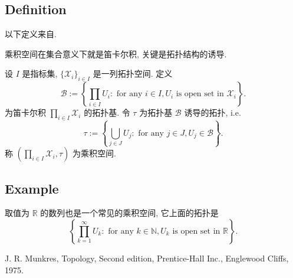 \documentclass[a4paper,11pt]{article}
\theoremstyle{definition}
\begin{document}
\subsection{Definition}

以下定义来自\cite[p.114]{m75}.

乘积空间在集合意义下就是笛卡尔积, 关键是拓扑结构的诱导.

设 $ I $ 是指标集, $ \{\mathcal{X}_i\}_{i \in I} $ 是一列拓扑空间.
定义
$$
    \mathcal{B}
        := \left\{ \prod_{i \in I} U_i
            : \text{ for any } i \in I, U_i \text{ is open set in } \mathcal{X}_i \right\}.
$$
为笛卡尔积 $ \prod_{i \in I} \mathcal{X}_i $ 的拓扑基. 令 $ \tau $ 为拓扑基 $ \mathcal{B} $ 诱导的拓扑, i.e.
$$
    \tau := \left\{ \bigcup_{j \in J} U_j
        : \text{ for any } j \in J, U_j \in \mathcal{B} \right\}.
$$
称 $ (\prod_{i \in I} \mathcal{X}_i, \tau) $ 为乘积空间.

\subsection{Example}

取值为 $ \mathbb{R} $ 的数列也是一个常见的乘积空间, 它上面的拓扑是
$$
    \left\{\prod_{k = 1}^\infty U_k 
        : \text{ for any } k \in \mathbb{N}, U_k \text{ is open set in } \mathbb{R} \right\}.
$$


\begin{thebibliography}{99}
     J. R. Munkres, Topology, Second edition, 
    Prentice-Hall Inc., Englewood Cliffs, 1975.
    
\end{thebibliography}
\end{document}
